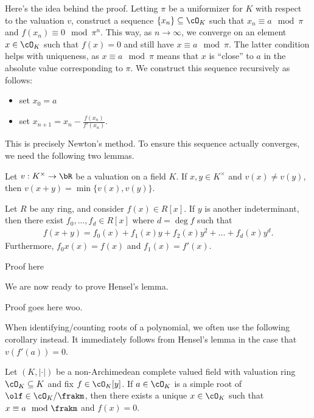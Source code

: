 Here's the idea behind the proof. Letting $\pi$ be a uniformizer for $K$ with respect to the valuation $v$, construct a sequence $\{x_n\} \subseteq \cO_K$ such that $x_n \equiv a \mod \pi$ and $f(x_n) \equiv 0 \mod \pi^n$. This way, as $n \to \infty$, we converge on an element $x \in \cO_K$ such that $f(x) = 0$ and still have $x \equiv a \mod \pi$. The latter condition helps with uniqueness, as $x \equiv a \mod \pi$ means that $x$ is ``close'' to $a$ in the absolute value corresponding to $\pi$. We construct this sequence recursively as follows:
\begin{itemize}
	\item set $x_0 = a$
	\item set $x_{n+1} = x_n - \frac{f(x_n)}{f'(x_n)}$.
\end{itemize}
This is precisely Newton's method. To ensure this sequence actually converges, we need the following two lemmas.
\begin{lem}\label{lem:case-of-equality}
	Let $v:K^\times\to \bR$ be a valuation on a field $K$. If $x,y\in K^\times$ and $v(x) \neq v(y)$, then $v(x+y) = \min\{v(x),v(y)\}$.
\end{lem}

\begin{lem}\label{lem:polynomial-lemma-hensel}
	Let $R$ be any ring, and consider $f(x) \in R[x]$. If $y$ is another indeterminant, then there exist $f_0,...,f_d \in R[x]$ where $d = \deg f$ such that
	\begin{align*}
		f(x+y) = f_0(x) + f_1(x)y + f_2(x)y^2 + ... + f_d(x)y^d.
	\end{align*}
	Furthermore, $f_0x(x) = f(x)$ and $f_1(x) = f'(x)$.
\end{lem}
\begin{prf}
	Proof here
\end{prf}
We are now ready to prove Hensel's lemma.
\begin{prf}
	Proof goes here woo. 
\end{prf}

When identifying/counting roots of a polynomial, we often use the following corollary instead. It immediately follows from Hensel's lemma in the case that $v(f'(a)) = 0$.
\begin{cor}\label{cor:simple-root-hensel}
	Let $(K,|\cdot|)$ be a non-Archimedean complete valued field with valuation ring $\cO_K \subseteq K$ and fix $f \in \cO_K[y]$. If $a\in \cO_K$ is a simple root of $\olf \in \cO_K/\frakm$, then there exists a unique $x \in \cO_K$ such that $x \equiv a \mod \frakm$ and $f(x) = 0$.
\end{cor}


